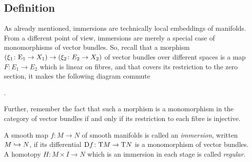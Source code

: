 \subsection{Definition}
As already mentioned, immersions are technically local embeddings of
manifolds.
From a different point of view, immersions are merely a special case
of monomorphisms of vector bundles. So, recall that a morphism
$(\xi_1\colon\mathrm{E}_1\to X_1)\to(\xi_2\colon E_2\to X_2)$ 
of vector bundles over different spaces is a map $F\colon E_1\to E_2$
which is linear on fibres, and that covers its restriction to the zero
section, \idest it makes the following diagram commute
\begin{center}
  .
\end{center}
Further, remember the fact that such a morphism is a monomorphism in
the category of vector bundles if and only if its restriction to each
fibre is injective.
\begin{Def}
  A smooth map $f\colon M\to N$ of smooth manifolds is called
  an \emph{immersion}, written $M\hookrightarrow N$, if its differential
  $\mathrm{D} f\colon\mathrm{T}M\to\mathrm{T}N$ is a monomorphism of vector
  bundles.
  A homotopy $H\colon M\times I\to N$ which is an immersion in each
  stage is called \emph{regular}.
\end{Def}
